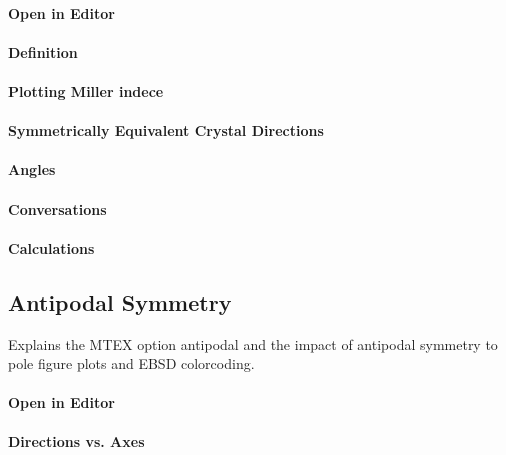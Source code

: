 \documentclass{article}
\begin{document}
                  
			\paragraph{Open in Editor}
		
			\paragraph{Definition}
		
			\paragraph{Plotting Miller indece}
		
			\paragraph{Symmetrically Equivalent Crystal Directions}
		
			\paragraph{Angles}
		
			\paragraph{Conversations}
		
			\paragraph{Calculations}
		
		\subsection{Antipodal Symmetry}

		
                     \begin{par}
Explains the MTEX option antipodal and the impact of antipodal symmetry to pole figure plots and EBSD colorcoding.
\end{par} \vspace{1em}

                  
			\paragraph{Open in Editor}
		
			\paragraph{Directions vs. Axes}
		
\end{document}
